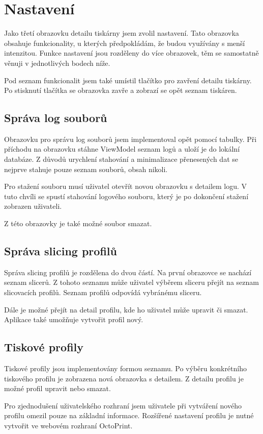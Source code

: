 \section{Nastavení}

Jako třetí obrazovku detailu tiskárny jsem zvolil nastavení.
Tato obrazovka obsahuje funkcionality, u kterých předpokládám, že budou využívány s menší intenzitou.
Funkce nastavení jsou rozděleny do více obrazovek, těm se samostatně věnuji v jednotlivých bodech níže.

Pod seznam funkcionalit jsem také umístil tlačítko pro zavření detailu tiskárny.
Po stisknutí tlačítka se obrazovka zavře a zobrazí se opět seznam tiskáren.

\subsection{Správa log souborů}

Obrazovku pro správu log souborů jsem implementoval opět pomocí tabulky.
Při příchodu na obrazovku stáhne ViewModel seznam logů a uloží je do lokální databáze.
Z důvodů urychlení stahování a minimalizace přenesených dat se nejprve stahuje pouze seznam souborů, obsah nikoli.

Pro stažení souboru musí uživatel otevřít novou obrazovku s detailem logu.
V tuto chvíli se spustí stahování logového souboru, který je po dokončení stažení zobrazen uživateli.

Z této obrazovky je také možné soubor smazat.

\subsection{Správa slicing profilů}

Správa slicing profilů je rozdělena do dvou částí.
Na první obrazovce se nachází seznam slicerů.
Z tohoto seznamu může uživatel výběrem sliceru přejít na seznam slicovacích profilů.
Seznam profilů odpovídá vybránému sliceru.

Dále je možné přejít na detail profilu, kde ho uživatel může upravit či smazat.
Aplikace také umožňuje vytvořit profil nový.

\subsection{Tiskové profily}

Tiskové profily jsou implementovány formou seznamu.
Po výběru konkrétního tiskového profilu je zobrazena nová obrazovka s detailem.
Z detailu profilu je možné profil upravit nebo smazat.

Pro zjednodušení uživatelského rozhraní jsem uživatele při vytváření nového profilu omezil pouze na základní informace.
Rozšířené nastavení profilu je nutné vytvořit ve webovém rozhraní OctoPrint.
